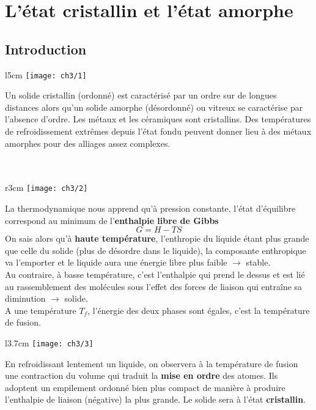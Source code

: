 
\chapter{L'état cristallin et l'état amorphe}
\section{Introduction}
	\begin{wrapfigure}[6]{l}{5cm}
	\vspace{-6mm}
	\texttt{[image: ch3/1]}
	\end{wrapfigure}
	Un solide cristallin (ordonné) est caractérisé par un ordre sur de longues distances alors qu'un solide amorphe (désordonné) ou vitreux se caractérise par l'absence d'ordre. Les métaux et les céramiques sont cristallins. Des températures de refroidissement extrêmes depuis l'état fondu peuvent donner lieu à des métaux amorphes pour des alliages assez complexes.\\\\\\
	
	\begin{wrapfigure}[6]{r}{3cm}
	\vspace{-10mm}
	\texttt{[image: ch3/2]}
	\end{wrapfigure}
	La thermodynamique nous apprend qu'à pression constante, l'état d'équilibre correspond au minimum de l'\textbf{enthalpie libre de Gibbs}
	\begin{equation}
		G = H-TS
	\end{equation}
	On sais alors qu'à \textbf{haute température}, l'enthropie du liquide étant plus grande que celle du solide (plus de désordre dans le liquide), la composante enthropique va l'emporter et le liquide aura une énergie libre plus faible $\rightarrow$ stable.\\
	Au contraire, à basse température, c'est l'enthalpie qui prend le dessus et est lié au rassemblement des molécules sous l'effet des forces de liaison qui entraîne sa diminution $\rightarrow$ solide.\\
	 A une température $T_f$, l'énergie des deux phases sont égales, c'est la température de fusion. 
	 
	\begin{wrapfigure}[7]{l}{3.7cm}
	\vspace{-5mm}
	\texttt{[image: ch3/3]}
	\end{wrapfigure}
	En refroidissant lentement un liquide, on observera à la température de fusion une contraction du volume qui traduit la \textbf{mise en ordre} des atomes. Ils adoptent un empilement ordonné bien plus compact de manière à produire l'enthalpie de liaison (négative) la plus grande. Le solide sera à l'état \textbf{cristallin}.\\
	
